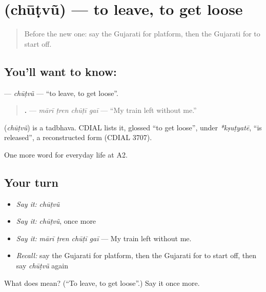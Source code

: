 \section[\texorpdfstring{\gu{છૂટવું} (chūṭvũ)}{છૂટવું (chūṭvũ)}]{ (chūṭvũ) — to leave, to get loose}

\label{lesson:GU-C204-chutvu}



\begin{quote}
Before the new one: say the Gujarati for platform, then the Gujarati for to start off.
\end{quote}

\subsection*{You'll want to know: }
\textbf{} — \emph{chūṭvũ} — \textquotedblleft{}to leave, to get loose\textquotedblright{}.

\begin{quote}
\textbf{   .} — \emph{mārī ṭren chūṭī gaī} — \textquotedblleft{}My train left without me.\textquotedblright{}
\end{quote}

\begin{cousinweb}
\textbf{} (\emph{chūṭvũ}) is a tadbhava. CDIAL lists it, glossed \textquotedblleft{}to get loose\textquotedblright{}, under \emph{*kṣuṭyatē}, \textquotedblleft{}is released\textquotedblright{}, a reconstructed form (CDIAL 3707).
\end{cousinweb}

\begin{grammarlens}[title={What you've built}]
One more word for everyday life at A2.
\end{grammarlens}

\subsection*{Your turn}
\begin{itemize}
\raggedright
  \item \emph{Say it:} \emph{chūṭvũ}
  \item \emph{Say it:} \emph{chūṭvũ}, once more
  \item \emph{Say it:} \emph{mārī ṭren chūṭī gaī} — My train left without me.
  \item \emph{Recall:} say the Gujarati for platform, then the Gujarati for to start off, then say \emph{chūṭvũ} again
\end{itemize}

\begin{tcolorbox}[breakable,colback=teal!4,colframe=teal!35!black,title={Before you move on}]
What does  mean? (\textquotedblleft{}To leave, to get loose\textquotedblright{}.) Say it once more.
\end{tcolorbox}
